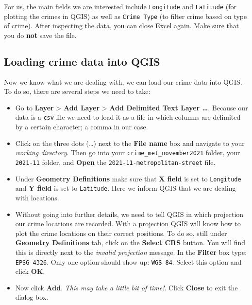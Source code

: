 \documentclass[
]{book}
\providecommand{\tightlist}{%
  \setlength{\itemsep}{0pt}\setlength{\parskip}{0pt}}
\begin{document}
For us, the main fields we are interested include \texttt{Longitude} and \texttt{Latitude} (for plotting the crimes in QGIS) as well as \texttt{Crime\ Type} (to filter crime based on type of crime). After inspecting the data, you can close Excel again. Make sure that you do \textbf{not} save the file.

\hypertarget{loading-crime-data-into-qgis}{%
\subsection*{Loading crime data into QGIS}\label{loading-crime-data-into-qgis}}

Now we know what we are dealing with, we can load our crime data into QGIS. To do so, there are several steps we need to take:

\begin{itemize}
\tightlist
\item
  Go to \textbf{Layer} \textgreater{} \textbf{Add Layer} \textgreater{} \textbf{Add Delimited Text Layer \ldots{}}. Because our data is a \texttt{csv} file we need to load it as a file in which columns are delimited by a certain character; a comma in our case.
\item
  Click on the three dots (\emph{\ldots{}}) next to the \textbf{File name} box and navigate to your \emph{working directory}. Then go into your \texttt{crime\_met\_november2021} folder, your \texttt{2021-11} folder, and \textbf{Open} the \texttt{2021-11-metropolitan-street} file.
\item
  Under \textbf{Geometry Definitions} make sure that \textbf{X field} is set to \texttt{Longitude} and \textbf{Y field} is set to \texttt{Latitude}. Here we inform QGIS that we are dealing with locations.
\item
  Without going into further details, we need to tell QGIS in which projection our crime locations are recorded. With a projection QGIS will know how to plot the crime locations on their correct positions. To do so, still under \textbf{Geometry Definitions} tab, click on the \textbf{Select CRS} button. You will find this is directly next to the \emph{invalid projection} message. In the \textbf{Filter} box type: \texttt{EPSG\ 4326}. Only one option should show up: \texttt{WGS\ 84}. Select this option and click \textbf{OK}.
\item
  Now click \textbf{Add}. \emph{This may take a little bit of time!}. Click \textbf{Close} to exit the dialog box.
\end{itemize}
\end{document}
